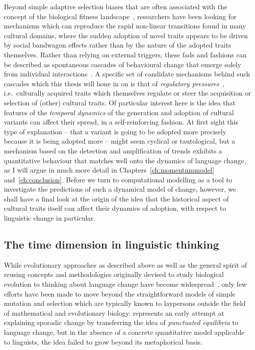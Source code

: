 Beyond simple adaptive selection biases that are often associated with the concept of the biological fitness landscape~\citep{Kaplan2008,Gerlee2015}, researchers have been looking for mechanisms which can reproduce the rapid non-linear transitions found in many cultural domains, where the sudden adoption of novel traits appears to be driven by social bandwagon effects rather than by the nature of the adopted traits themselves. Rather than relying on external triggers, these fads and fashions can be described as spontaneous cascades of behavioural change that emerge solely from individual interactions~\citep{Bikhchandani1998,Goldstone2008}. A specific set of candidate mechanisms behind such cascades which this thesis will hone in on is that of \emph{regulatory pressures}~\citep{Acerbi2014}, i.e.~culturally acquired traits which themselves regulate or steer the acquisition or selection of (other) cultural traits. Of particular interest here is the idea that features of the \emph{temporal dynamics} of the generation and adoption of cultural variants can affect their spread, in a self-reinforcing fashion. At first sight this type of explanation -- that a variant is going to be adopted more precisely because it is being adopted more -- might seem cyclical or tautological, but a mechanism based on the detection and amplification of trends exhibits a quantitative behaviour that matches well onto the dynamics of language change, as I will argue in much more detail in Chapters~\ref{ch:momentummodel} and~\ref{ch:conclusion}.
Before we turn to computational modelling as a tool to investigate the predictions of such a dynamical model of change, however, we shall have a final look at the origin of the idea that the historical aspect of cultural traits itself can affect their dynamics of adoption, with respect to linguistic change in particular.

\subsection{The time dimension in linguistic thinking}

While evolutionary approaches as described above as well as the general spirit of reusing concepts and methodologies originally devised to study biological evolution to thinking about language change have become widespread~\citep{Atkinson2005}, only few efforts have been made to move beyond the straightforward models of simple mutation and selection which are typically known to laypersons outside the field of mathematical and evolutionary biology.
\citet{Dixon1997} represents an early attempt at explaining sporadic change by transferring the idea of \emph{punctuated equilibria} to language change, but in the absence of a concrete quantitative model applicable to linguists, the idea failed to grow beyond its metaphorical basis.

